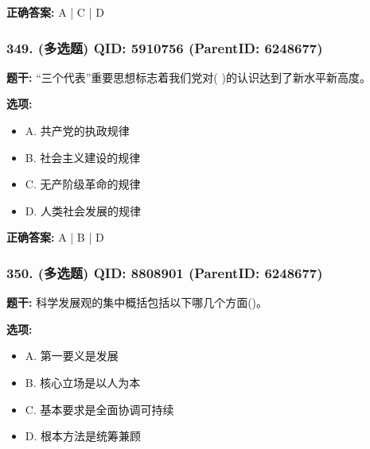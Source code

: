 \documentclass[12pt,UTF8]{ctexart}
\begin{document}
\textbf{正确答案:}
A | C | D

\vspace{0.3em}\hrulefill\vspace{0.7em}

\subsubsection*{349. (多选题) \small QID: 5910756 (ParentID: 6248677)}

\textbf{题干:}
“三个代表”重要思想标志着我们党对( )的认识达到了新水平新高度。



\textbf{选项:}
\begin{itemize}[leftmargin=*]

  \item A. 共产党的执政规律

  \item B. 社会主义建设的规律

  \item C. 无产阶级革命的规律

  \item D. 人类社会发展的规律

\end{itemize}

\textbf{正确答案:}
A | B | D

\vspace{0.3em}\hrulefill\vspace{0.7em}

\subsubsection*{350. (多选题) \small QID: 8808901 (ParentID: 6248677)}

\textbf{题干:}
科学发展观的集中概括包括以下哪几个方面()。



\textbf{选项:}
\begin{itemize}[leftmargin=*]

  \item A. 第一要义是发展

  \item B. 核心立场是以人为本

  \item C. 基本要求是全面协调可持续

  \item D. 根本方法是统筹兼顾

\end{itemize}
\end{document}
